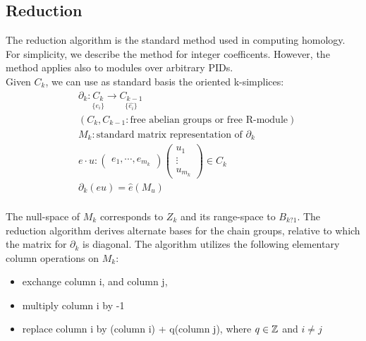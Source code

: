 \documentclass[11pt,a4paper]{report}
\begin{document}
              \subsection{Reduction} 
              
              The reduction algorithm is the standard method used in computing homology. For simplicity, 
              we describe the method for integer coefficents. However, the method applies also to modules over arbitrary PIDs. \\
              
              Given $C_k$, we can use as standard basis the oriented k-simplices:
              \begin{align*}
                &\partial_k: \underset{\{e_i\}}{C_k} \rightarrow \underset{\{\hat{e_i}\}}{C_{k-1}}\\
                &(C_{k}, C_{k-1}: \textrm{free abelian groups or free R-module})\\
                & M_k: \textrm{standard matrix representation of } \partial_k\\
                &e \cdot u: {\begin{pmatrix}e_1, \cdots, e_{m_k}\end{pmatrix}}{\begin{pmatrix}u_1\\\vdots\\u_{m_k}\end{pmatrix}} \in C_k\\
                &\partial_k(eu) = \hat{e}(M_u)\\
              \end{align*}
              
               The null-space of $M_k$ corresponds to $Z_k$ and its range-space to
                $B_{k?1}$. The reduction algorithm derives alternate bases for the
                chain groups, relative to which the matrix for $\partial_k$ is diagonal. The algorithm utilizes the following elementary column operations on $M_k$:
                
                \begin{itemize}
                 \item exchange column i, and column j,
                 \item multiply column i by -1
                 \item replace column i by (column i) + q(column j), where $q \in \mathbb{Z}$ and $i \ne j$
                \end{itemize}
\end{document}
